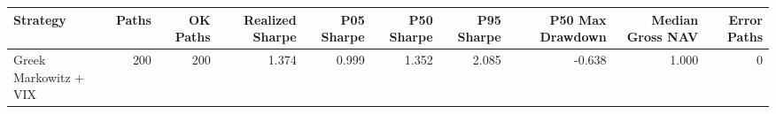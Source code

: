 \begin{tabular}{lrrrrrrrrr}
\toprule
Strategy & Paths & OK Paths & Realized Sharpe & P05 Sharpe & P50 Sharpe & P95 Sharpe & P50 Max Drawdown & Median Gross NAV & Error Paths \\
\midrule
Greek Markowitz + VIX & 200 & 200 & 1.374 & 0.999 & 1.352 & 2.085 & -0.638 & 1.000 & 0 \\
\bottomrule
\end{tabular}
